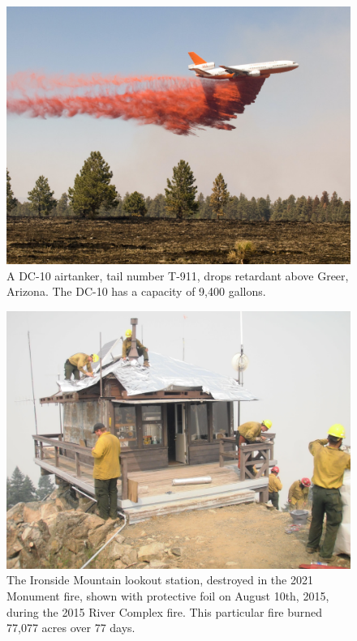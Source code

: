 \documentclass[]             %
{NASA}                       %
\theoremstyle{definition}
\begin{document}
\begin{figure}[h]
\centering
\includegraphics[scale=0.4]{images/dc10.jpg}
\caption{A DC-10 airtanker, tail number T-911, drops retardant above Greer, Arizona. The DC-10 has a capacity of 9,400 gallons.}
\end{figure}

\begin{figure}[h]
\centering
\includegraphics[scale=0.085]{images/ironside.jpg}
\caption{The Ironside Mountain lookout station, destroyed in the 2021 Monument fire, shown with protective foil on August 10th, 2015, during the 2015 River Complex fire. This particular fire burned 77,077 acres over 77 days.}
\end{figure}
\end{document}
